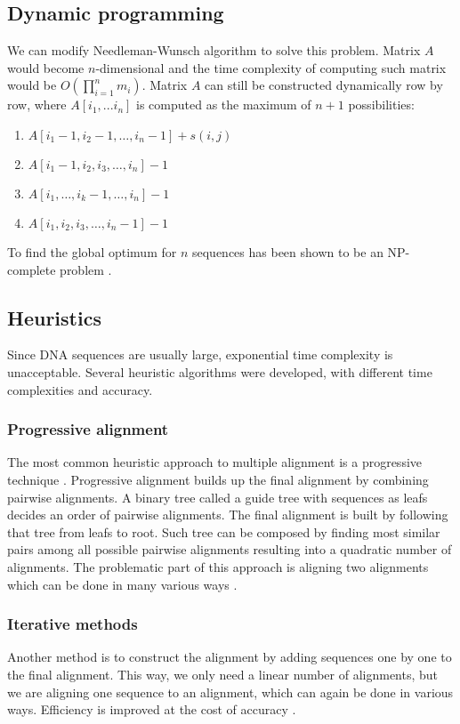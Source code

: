 \subsection{Dynamic programming}
We can modify Needleman-Wunsch algorithm to solve this problem.
Matrix $A$ would become $n$-dimensional and the time complexity of computing such matrix would be $O(\prod\limits_{i=1}^{n} m_{i})$.
Matrix $A$ can still be constructed dynamically row by row, where $A[i_1,...i_n]$ is computed as the maximum of $n+1$ possibilities:
\begin{enumerate}
\item $A[i_1-1,i_2-1, \dots, i_n-1]+s(i,j)$
\item $A[i_1-1, i_2, i_3, \dots, i_n]-1$
\renewcommand{\labelenumi}{\alph{enumi}+1.}
\setcounter{enumi}{10}
\item $A[i_1,\dots, i_k-1, \dots, i_n]-1$
\setcounter{enumi}{13}
\item $A[i_1, i_2, i_3, \dots, i_n-1]-1$
\end{enumerate}

To find the global optimum for $n$ sequences has been shown to be an NP-complete problem \cite{wang1994complexity}.

\subsection{Heuristics}
Since DNA sequences are usually large, exponential time complexity is unacceptable.
Several heuristic algorithms were developed, with different time complexities and accuracy.

\subsubsection{Progressive alignment}
The most common heuristic approach to multiple alignment is a progressive technique \cite{progressive}.
Progressive alignment builds up the final alignment by combining pairwise alignments.
A binary tree called a guide tree with sequences as leafs decides an order of pairwise alignments.
The final alignment is built by following that tree from leafs to root.
Such tree can be composed by finding most similar pairs among all possible pairwise alignments resulting into
a quadratic number of alignments.
The problematic part of this approach is aligning two alignments which can be done in many various ways \cite{baum}.

\subsubsection{Iterative methods}
Another method is to construct the alignment by adding sequences one by one to the final alignment.
This way, we only need a linear number of alignments, but we are aligning one sequence to an alignment, which can again be done in various ways.
Efficiency is improved at the cost of accuracy \cite{iterative}.